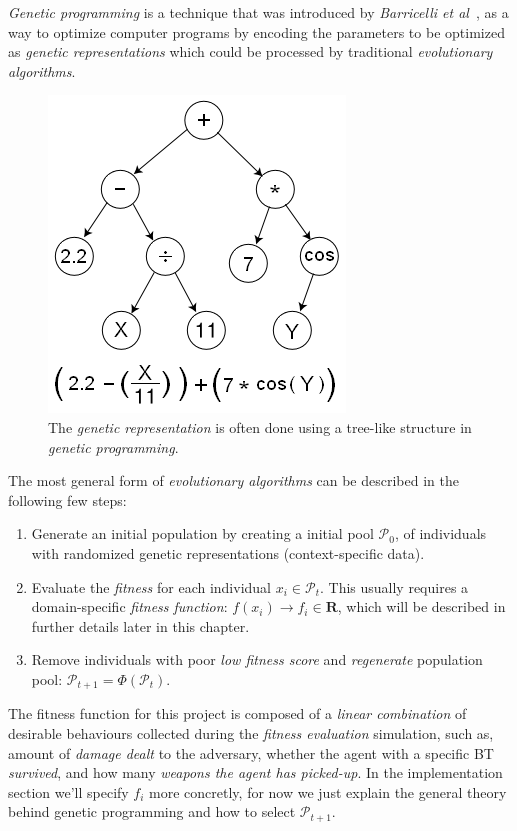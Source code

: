\documentclass[a4paper, twocolumn]{article}
\begin{document}
	\emph{Genetic programming} is a technique that was introduced by \emph{Barricelli et al}~\cite{barricelli1954esempi}, as a way to optimize computer programs by encoding the parameters to be optimized as \emph{genetic representations} which could be processed by traditional \emph{evolutionary algorithms}.

	\begin{figure}[H]
        \centering
		\includegraphics[width=0.5\linewidth]{share/Genetic_Program_Tree.png}
		\caption{The \emph{genetic representation} is often done using a tree-like structure in \emph{genetic programming}.}
		\label{fig:genetic_representation}
	\end{figure}

	The most general form of \emph{evolutionary algorithms} can be described in the following few steps:
    \begin{enumerate}
        \item Generate an initial population by creating a initial pool \(\mathcal{P}_0\), of individuals with randomized genetic representations (context-specific data).
        \item Evaluate the \emph{fitness} for each individual \(x_i \in \mathcal{P}_t\). This usually requires a domain-specific \emph{fitness function}: \(f(x_i)\rightarrow f_i \in \mathbf{R}\), which will be described in further details later in this chapter.
        \item Remove individuals with poor \textit{low fitness score} and \emph{regenerate} population pool: \(\mathcal{P}_{t+1} = \Phi(\mathcal{P}_t)\).
    \end{enumerate}

    The fitness function for this project is composed of a \emph{linear combination} of desirable behaviours collected during the \emph{fitness evaluation} simulation, such as, amount of \emph{damage dealt} to the adversary, whether the agent with a specific BT \emph{survived}, and how many \emph{weapons the agent has picked-up}. In the implementation section we'll specify \(f_i\) more concretly, for now we just explain the general theory behind genetic programming and how to select \(\mathcal{P}_{t+1}\).
\end{document}
